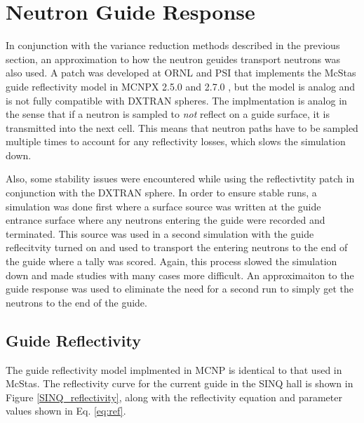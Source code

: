 \documentclass[a4paper]{jpconf}
\begin{document}
\section{Neutron Guide Response} 

In conjunction with the variance reduction methods described in the previous section, an approximation to how the neutron geuides transport neutrons was also used.  A patch was developed at ORNL and PSI that implements the McStas guide reflectivity model in MCNPX 2.5.0 and 2.7.0 \cite{mcnp_reflectivity, EK_reflectivity}, but the model is analog and is not fully compatible with DXTRAN spheres.  The implmentation is analog in the sense that if a neutron is sampled to \emph{not} reflect on a guide surface, it is transmitted into the next cell.  This means that neutron paths have to be sampled multiple times to account for any reflectivity losses, which slows the simulation down.  

Also, some stability issues were encountered while using the reflectivtity patch in conjunction with the DXTRAN sphere.  In order to ensure stable runs, a simulation was done first where a surface source was written at the guide entrance surface where any neutrons entering the guide were recorded and terminated.  This source was used in a second simulation with the guide reflecitvity turned on and used to transport the entering neutrons to the end of the guide where a tally was scored.  Again, this process slowed the simulation down and made studies with many cases more difficult.  An approximaiton to the guide response was used to eliminate the need for a second run to simply get the neutrons to the end of the guide.


\subsection{Guide Reflectivity}

The guide reflectivity model implmented in MCNP is identical to that used in McStas.  The reflectivity curve for the current guide in the SINQ hall is shown in Figure \ref{SINQ_reflectivity}, along with the reflectivity equation and parameter values shown in Eq. \ref{eq:ref}.
\end{document}
